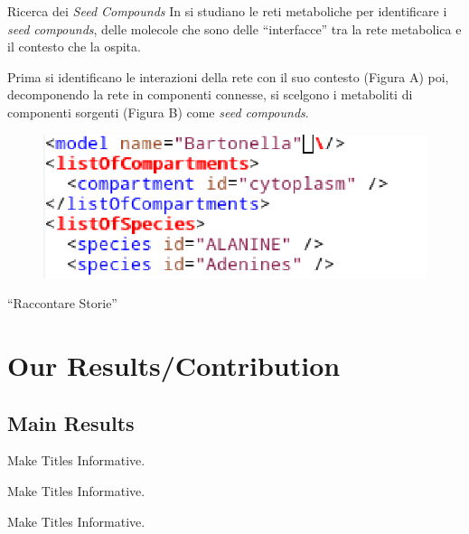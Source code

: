 \documentclass{beamer}
\begin{document}
\begin{frame}{Ricerca dei \emph{Seed Compounds}}
  In \cite{Borenstein-Kupiec} si studiano le reti metaboliche per
  identificare i \emph{seed compounds}, delle molecole che sono delle
  ``interfacce'' tra la rete metabolica e il contesto che la ospita.

  Prima si identificano le interazioni della rete con il suo contesto
  (Figura A) poi, decomponendo la rete in componenti connesse, si
  scelgono i metaboliti di componenti sorgenti (Figura B) come
  \emph{seed compounds}.

  \begin{figure}
    \includegraphics[scale=.6]{images/sbml-code-chunk.eps}
  \end{figure}

\end{frame}

\begin{frame}{``Raccontare Storie''}
\end{frame}



\section{Our Results/Contribution}

\subsection{Main Results}

\begin{frame}{Make Titles Informative.}
\end{frame}

\begin{frame}{Make Titles Informative.}
\end{frame}

\begin{frame}{Make Titles Informative.}
\end{frame}
\end{document}
